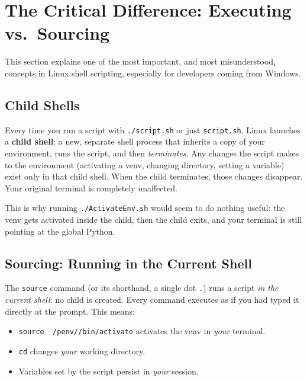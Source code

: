 \section{The Critical Difference: Executing vs.\ Sourcing}
\label{sec:source-vs-execute}

This section explains one of the most important, and most
misunderstood, concepts in Linux shell scripting, especially for
developers coming from Windows.

\subsection{Child Shells}

Every time you run a script with \texttt{./script.sh} or just
\texttt{script.sh}, Linux launches a \textbf{child shell}: a new,
separate shell process that inherits a copy of your environment, runs
the script, and then \emph{terminates}. Any changes the script makes to
the environment (activating a venv, changing directory, setting a
variable) exist only in that child shell. When the child terminates,
those changes disappear. Your original terminal is completely unaffected.

This is why running \texttt{./ActivateEnv.sh} would seem to do
nothing useful: the venv gets activated inside the child, then the child
exits, and your terminal is still pointing at the global Python.

\subsection{Sourcing: Running in the Current Shell}

The \texttt{source} command (or its shorthand, a single dot \texttt{.})
runs a script \emph{in the current shell}: no child is created. Every
command executes as if you had typed it directly at the prompt. This means:

\begin{itemize}
  \item \texttt{source ~/penv/\ProjectName{}/bin/activate} activates the venv
        in \emph{your} terminal.
  \item \texttt{cd} changes \emph{your} working directory.
  \item Variables set by the script persist in \emph{your} session.
\end{itemize}

